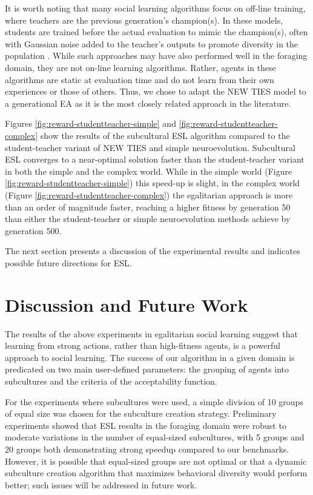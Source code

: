 \documentclass{sig-alternate}
\begin{document}
It is worth noting that many social learning algorithms focus on off-line training, where teachers are the previous generation's champion(s). In these models, students are trained before the actual evaluation to mimic the champion(s), often with Gaussian noise added to the teacher's outputs to promote diversity in the population \cite{denaro1996cultural}. While such approaches may have also performed well in the foraging domain, they are not on-line learning algorithms. Rather, agents in these algorithms are static at evaluation time and do not learn from their own experiences or those of others. Thus, we chose to adapt the NEW TIES model to a generational EA as it is the most closely related approach in the literature.

Figures \ref{fig:reward-studentteacher-simple} and \ref{fig:reward-studentteacher-complex} show the results of the subcultural ESL algorithm compared to the student-teacher variant of NEW TIES and simple neuroevolution. Subcultural ESL converges to a near-optimal solution faster than the student-teacher variant in both the simple and the complex world. While in the simple world (Figure \ref{fig:reward-studentteacher-simple}) this speed-up is slight, in the complex world (Figure  \ref{fig:reward-studentteacher-complex}) the egalitarian approach is more than an order of magnitude faster, reaching a higher fitness by generation 50 than either the student-teacher or simple neuroevolution methods achieve by generation 500.

The next section presents a discussion of the experimental results and indicates possible future directions for ESL.

\section{Discussion and Future Work}
\label{sec:future}
The results of the above experiments in egalitarian social learning suggest that learning from strong actions, rather than high-fitness agents, is a powerful approach to social learning. The success of our algorithm in a given domain is predicated on two main user-defined parameters: the grouping of agents into subcultures and the criteria of the acceptability function.

For the experiments where subcultures were used, a simple division of 10 groups of equal size was chosen for the subculture creation strategy. Preliminary experiments showed that ESL results in the foraging domain were robust to moderate variations in the number of equal-sized subcultures, with 5 groups and 20 groups both demonstrating strong speedup compared to our benchmarks. However, it is possible that equal-sized groups are not optimal or that a dynamic subculture creation algorithm that maximizes behavioral diversity would perform better; such issues will be addressed in future work.
\end{document}
